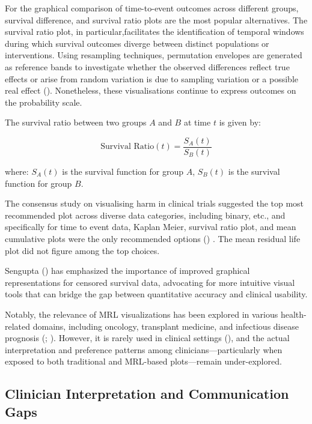 \documentclass[
  onecolumn]{article}
\begin{document}
For the graphical comparison of time-to-event outcomes across different
groups, survival difference, and survival ratio plots are the most
popular alternatives. The survival ratio plot, in particular,facilitates
the identification of temporal windows during which survival outcomes
diverge between distinct populations or interventions. Using resampling
techniques, permutation envelopes are generated as reference bands to
investigate whether the observed differences reflect true effects or
arise from random variation is due to sampling variation or a possible
real effect (\citet{newellSurvivalRatioPlots2006c}). Nonetheless, these
visualisations continue to express outcomes on the probability scale.

The survival ratio between two groups \(A\) and \(B\) at time \(t\) is
given by:

\begin{equation}
\text{Survival Ratio}(t) = \frac{S_A(t)}{S_B(t)}
\label{eq:survival_ratio}
\end{equation}

where: \(S_A(t)\) is the survival function for group \(A\), \(S_B(t)\)
is the survival function for group \(B\).

The consensus study on visualising harm in clinical trials suggested the
top most recommended plot across diverse data categories, including
binary, etc., and specifically for time to event data, Kaplan Meier,
survival ratio plot, and mean cumulative plots were the only recommended
options (\citet{phillipsVisualisingHarmsPublications2022}) . The mean
residual life plot did not figure among the top choices.

Sengupta (\citet{senguptaGraphicalToolsCensored1995}) has emphasized the
importance of improved graphical representations for censored survival
data, advocating for more intuitive visual tools that can bridge the gap
between quantitative accuracy and clinical usability.

Notably, the relevance of MRL visualizations has been explored in
various health-related domains, including oncology, transplant medicine,
and infectious disease prognosis
(\citet{achilonuModellingGraftSurvival2017};
\citet{qayoomDevelopmentNovelExtension2025}). However, it is rarely used
in clinical settings
(\citet{alvarez-iglesiasSummarisingCensoredSurvival2015a}), and the
actual interpretation and preference patterns among
clinicians---particularly when exposed to both traditional and MRL-based
plots---remain under-explored.

\subsection{Clinician Interpretation and Communication
Gaps}\label{clinician-interpretation-and-communication-gaps}
\end{document}
